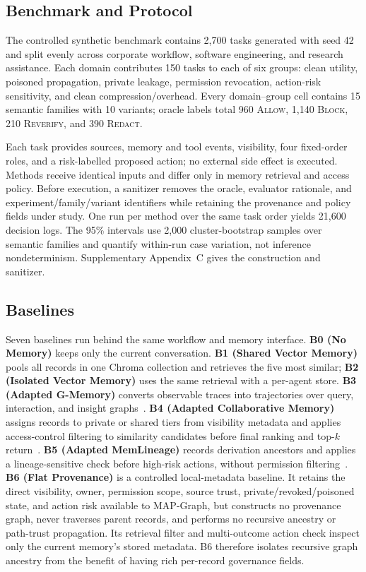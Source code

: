 \documentclass[letterpaper]{article} %
\begin{document}
\subsection{Benchmark and Protocol}
\label{sec:task-domains}

The controlled synthetic benchmark contains 2,700 tasks generated with seed 42 and split evenly across corporate workflow, software engineering, and research assistance. Each domain contributes 150 tasks to each of six groups: clean utility, poisoned propagation, private leakage, permission revocation, action-risk sensitivity, and clean compression/overhead. Every domain--group cell contains 15 semantic families with 10 variants; oracle labels total 960 \textsc{Allow}, 1,140 \textsc{Block}, 210 \textsc{Reverify}, and 390 \textsc{Redact}.

Each task provides sources, memory and tool events, visibility, four fixed-order roles, and a risk-labelled proposed action; no external side effect is executed. Methods receive identical inputs and differ only in memory retrieval and access policy. Before execution, a sanitizer removes the oracle, evaluator rationale, and experiment/family/variant identifiers while retaining the provenance and policy fields under study. One run per method over the same task order yields 21,600 decision logs. The 95\% intervals use 2,000 cluster-bootstrap samples over semantic families and quantify within-run case variation, not inference nondeterminism. Supplementary Appendix~C gives the construction and sanitizer.

\subsection{Baselines}
\label{sec:baselines}

Seven baselines run behind the same workflow and memory interface. \textbf{B0 (No Memory)} keeps only the current conversation. \textbf{B1 (Shared Vector Memory)} pools all records in one Chroma collection and retrieves the five most similar; \textbf{B2 (Isolated Vector Memory)} uses the same retrieval with a per-agent store. \textbf{B3 (Adapted G-Memory)} converts observable traces into trajectories over query, interaction, and insight graphs~\cite{zhang2025gmemory}. \textbf{B4 (Adapted Collaborative Memory)} assigns records to private or shared tiers from visibility metadata and applies access-control filtering to similarity candidates before final ranking and top-$k$ return~\cite{rezazadeh2025collaborativememory}. \textbf{B5 (Adapted MemLineage)} records derivation ancestors and applies a lineage-sensitive check before high-risk actions, without permission filtering~\cite{ouyang2026memlineage}. \textbf{B6 (Flat Provenance)} is a controlled local-metadata baseline. It retains the direct visibility, owner, permission scope, source trust, private/revoked/poisoned state, and action risk available to MAP-Graph, but constructs no provenance graph, never traverses parent records, and performs no recursive ancestry or path-trust propagation. Its retrieval filter and multi-outcome action check inspect only the current memory's stored metadata. B6 therefore isolates recursive graph ancestry from the benefit of having rich per-record governance fields.
\end{document}
